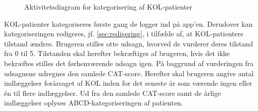 \begin{figure} [H]
\caption{Aktivitetsdiagram for kategorisering af KOL-patienter}
\label{fig:Kate}
\end{figure}

KOL-patienter kategoriseres første gang de logger ind på app'en. Derudover kan kategoriseringen redigeres, jf. \autoref{sec:redigering}, i tilfælde af, at KOL-patienters tilstand ændres.
Brugeren stilles otte udsagn, hvorved de vurderer deres tilstand fra 0 til 5. Tilstanden skal herefter bekræftiges af brugeren, hvis det ikke bekræftes stilles det førhenværende udsagn igen. På baggrund af vurderingen fra udsagnene udregnes den samlede CAT-score. Herefter skal brugeren angive antal indlæggelser forårsaget af KOL inden for det seneste år som værende ingen eller én til flere indlæggelser. Ud fra den samlede CAT-score samt de årlige indlæggelser oplyses ABCD-kategoriseringen af patienten. 